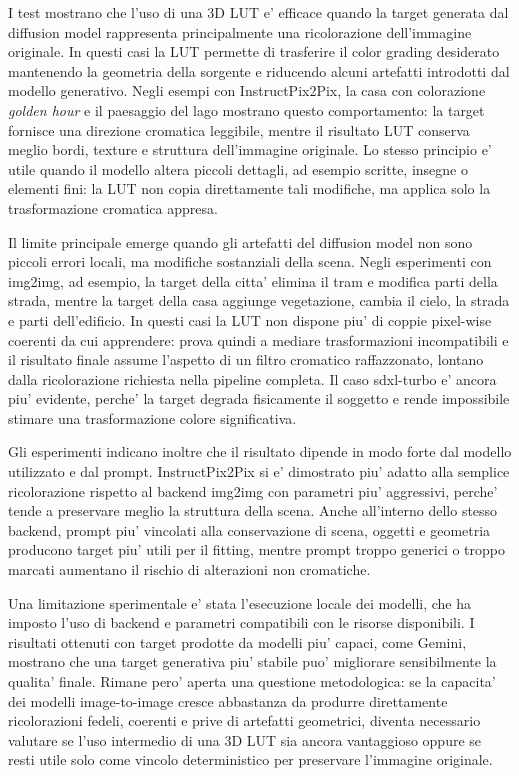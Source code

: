 \documentclass[12pt,a4paper]{report}
\renewcommand{\texttt}[1]{{\normalfont #1}}
\begin{document}
I test mostrano che l'uso di una 3D LUT e' efficace quando la target generata dal diffusion model rappresenta principalmente una ricolorazione dell'immagine originale. In questi casi la LUT permette di trasferire il color grading desiderato mantenendo la geometria della sorgente e riducendo alcuni artefatti introdotti dal modello generativo. Negli esempi con InstructPix2Pix, la casa con colorazione \textit{golden hour} e il paesaggio del lago mostrano questo comportamento: la target fornisce una direzione cromatica leggibile, mentre il risultato LUT conserva meglio bordi, texture e struttura dell'immagine originale. Lo stesso principio e' utile quando il modello altera piccoli dettagli, ad esempio scritte, insegne o elementi fini: la LUT non copia direttamente tali modifiche, ma applica solo la trasformazione cromatica appresa.

Il limite principale emerge quando gli artefatti del diffusion model non sono piccoli errori locali, ma modifiche sostanziali della scena. Negli esperimenti con \texttt{img2img}, ad esempio, la target della citta' elimina il tram e modifica parti della strada, mentre la target della casa aggiunge vegetazione, cambia il cielo, la strada e parti dell'edificio. In questi casi la LUT non dispone piu' di coppie pixel-wise coerenti da cui apprendere: prova quindi a mediare trasformazioni incompatibili e il risultato finale assume l'aspetto di un filtro cromatico raffazzonato, lontano dalla ricolorazione richiesta nella pipeline completa. Il caso \texttt{sdxl-turbo} e' ancora piu' evidente, perche' la target degrada fisicamente il soggetto e rende impossibile stimare una trasformazione colore significativa.

Gli esperimenti indicano inoltre che il risultato dipende in modo forte dal modello utilizzato e dal prompt. InstructPix2Pix si e' dimostrato piu' adatto alla semplice ricolorazione rispetto al backend \texttt{img2img} con parametri piu' aggressivi, perche' tende a preservare meglio la struttura della scena. Anche all'interno dello stesso backend, prompt piu' vincolati alla conservazione di scena, oggetti e geometria producono target piu' utili per il fitting, mentre prompt troppo generici o troppo marcati aumentano il rischio di alterazioni non cromatiche.

Una limitazione sperimentale e' stata l'esecuzione locale dei modelli, che ha imposto l'uso di backend e parametri compatibili con le risorse disponibili. I risultati ottenuti con target prodotte da modelli piu' capaci, come Gemini, mostrano che una target generativa piu' stabile puo' migliorare sensibilmente la qualita' finale. Rimane pero' aperta una questione metodologica: se la capacita' dei modelli image-to-image cresce abbastanza da produrre direttamente ricolorazioni fedeli, coerenti e prive di artefatti geometrici, diventa necessario valutare se l'uso intermedio di una 3D LUT sia ancora vantaggioso oppure se resti utile solo come vincolo deterministico per preservare l'immagine originale.
\end{document}
